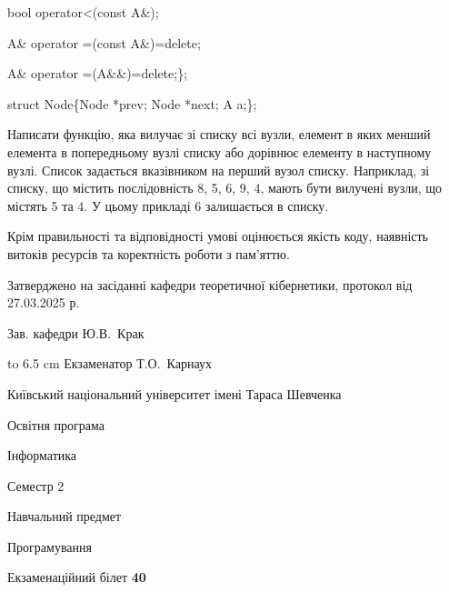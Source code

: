 \documentclass[12pt, ukrainian]{article}
\begin{document}
{\quad  bool operator<(const A\&); 

\quad A\& operator =(const A\&)=delete; 

\quad  A\& operator =(A\&\&)=delete;\};

struct Node\{Node *prev; Node *next; A a;\};

Написати функцію, яка вилучає зі списку всі вузли, елемент в яких менший елемента в попередньому вузлі списку або дорівнює елементу в наступному вузлі. Список задається вказівником на перший вузол списку. Наприклад, зі списку, що містить послідовність 8, 5, 6, 9, 4, мають бути вилучені вузли, що містять 5 та 4. У цьому прикладі 6 залишається в списку.

Крім правильності та відповідності умові оцінюється якість коду, наявність витоків ресурсів та коректність роботи з пам'яттю. 

}
{\smallskip\smallskip \begin {scriptsize} Затверджено на засіданні кафедри теоретичної кібернетики, протокол   від   27.03.2025 р.\par\smallskip\smallskip\smallskip\smallskip
{\parbox {6.5 cm} {Зав. кафедри \dotfill Ю.В.~Крак}}\hspace {0.7cm} {\hbox to 6.5 cm { Екзаменатор \dotfill Т.О.~Карнаух}} \end{scriptsize}}
\newpage
{{\begin {scriptsize}\par
{ \center  Київський національний університет імені Тараса Шевченка \par}
{\parbox {5 cm}{Освітня програма \hfill}{\parbox {7 cm}{Інформатика\hfill}}\parbox {6 cm}{\hfill Семестр 2}}\par
{\parbox {5 cm} {Навчальний предмет \hfill}\parbox {7 cm}{Програмування \hfill}\parbox {6cm}{\hfill}\par}\vspace{-15pt} \end{scriptsize}}{\center Екзаменаційний білет \No \textbf { 40 }\par}}
\end{document}
